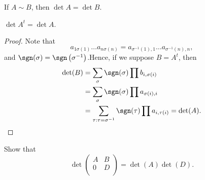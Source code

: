 \begin{theorem}
    If \(A \sim B\), then \(\det A = \det B\).  
\end{theorem}

\begin{theorem}
    \(\det A^t = \det A\). 
\end{theorem}
\begin{proof}
Note that 
\[
    a_{1 \sigma (1)} \dots a_{n \sigma (n)} = a_{\sigma ^{-1}(1), 1} \dots a_{\sigma ^{-1}(n), n},
\]
and \(\sgn (\sigma ) = \sgn \left( \sigma ^{-1} \right)  \).Hence, if we suppose \(B = A^t\), then
\begin{align*}
    \det (B) &= \sum_{\sigma} \sgn (\sigma ) \prod b_{i, \sigma (i)} \\
    &= \sum_{\sigma } \sgn (\sigma ) \prod a_{\sigma (i), i} \\
    &= \sum_{\tau: \tau = \sigma ^{-1} } \sgn (\tau ) \prod a_{i, \tau (i)} = \det (A).  
\end{align*}   
\end{proof}

\begin{exercise}
    Show that 
    \[
        \det \begin{pmatrix}
            A & B  \\
            0 & D  \\
        \end{pmatrix} = \det (A) \det (D).
    \]
\end{exercise}


